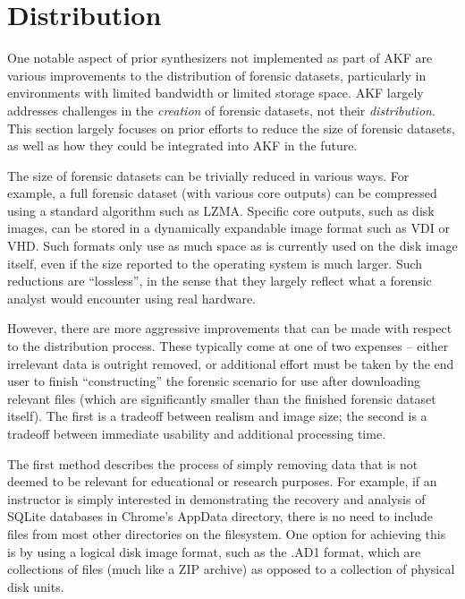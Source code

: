 \section{Distribution}\label{distribution}

One notable aspect of prior synthesizers not implemented as part of AKF
are various improvements to the distribution of forensic datasets,
particularly in environments with limited bandwidth or limited storage
space. AKF largely addresses challenges in the \emph{creation} of
forensic datasets, not their \emph{distribution}. This section largely
focuses on prior efforts to reduce the size of forensic datasets, as
well as how they could be integrated into AKF in the future.

The size of forensic datasets can be trivially reduced in various ways.
For example, a full forensic dataset (with various core outputs) can be
compressed using a standard algorithm such as LZMA. Specific core
outputs, such as disk images, can be stored in a dynamically expandable
image format such as VDI or VHD. Such formats only use as much space as
is currently used on the disk image itself, even if the size reported to
the operating system is much larger. Such reductions are ``lossless'',
in the sense that they largely reflect what a forensic analyst would
encounter using real hardware.

However, there are more aggressive improvements that can be made with
respect to the distribution process. These typically come at one of two
expenses -- either irrelevant data is outright removed, or additional
effort must be taken by the end user to finish ``constructing'' the
forensic scenario for use after downloading relevant files (which are
significantly smaller than the finished forensic dataset itself). The
first is a tradeoff between realism and image size; the second is a
tradeoff between immediate usability and additional processing time.

The first method describes the process of simply removing data that is
not deemed to be relevant for educational or research purposes. For
example, if an instructor is simply interested in demonstrating the
recovery and analysis of SQLite databases in Chrome's AppData directory,
there is no need to include files from most other directories on the
filesystem. One option for achieving this is by using a logical disk
image format, such as the .AD1 format, which are collections of files
(much like a ZIP archive) as opposed to a collection of physical disk
units.

